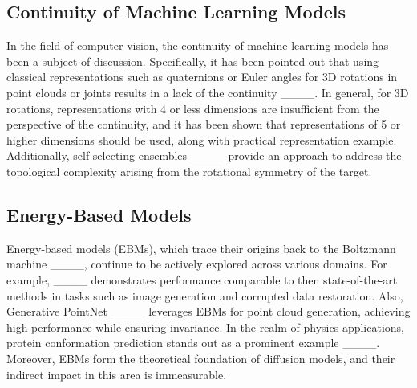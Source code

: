 \subsection{Continuity of Machine Learning Models}
In the field of computer vision, the continuity of machine learning models has been a subject of discussion. Specifically, it has been pointed out that using classical representations such as quaternions or Euler angles for 3D rotations in point clouds or joints results in a lack of the continuity ____. In general, for 3D rotations, representations with 4 or less dimensions are insufficient from the perspective of the continuity, and it has been shown that representations of 5 or higher dimensions should be used, along with practical representation example. Additionally, self-selecting ensembles ____ provide an approach to address the topological complexity arising from the rotational symmetry of the target.

\subsection{Energy-Based Models}
Energy-based models (EBMs), which trace their origins back to the Boltzmann machine ____, continue to be actively explored across various domains. For example, ____ demonstrates performance comparable to then state-of-the-art methods in tasks such as image generation and corrupted data restoration. Also, Generative PointNet ____ leverages EBMs for point cloud generation, achieving high performance while ensuring invariance. In the realm of physics applications, protein conformation prediction stands out as a prominent example ____. Moreover, EBMs form the theoretical foundation of diffusion models, and their indirect impact in this area is immeasurable.
